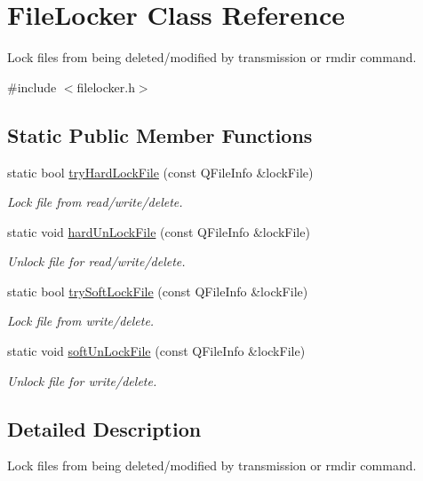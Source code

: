 \hypertarget{classFileLocker}{}\section{File\+Locker Class Reference}
\label{classFileLocker}


Lock files from being deleted/modified by transmission or rmdir command.  




{\ttfamily \#include $<$filelocker.\+h$>$}

\subsection*{Static Public Member Functions}
\begin{DoxyCompactItemize}
\item 
static bool \hyperlink{classFileLocker_ad8380762c767d038ec02d936bf974180}{try\+Hard\+Lock\+File} (const Q\+File\+Info \&lock\+File)
\begin{DoxyCompactList}\small\item\em Lock file from read/write/delete. \end{DoxyCompactList}\item 
static void \hyperlink{classFileLocker_a22ccc8e611b73bdfad46f410530c5ac9}{hard\+Un\+Lock\+File} (const Q\+File\+Info \&lock\+File)
\begin{DoxyCompactList}\small\item\em Unlock file for read/write/delete. \end{DoxyCompactList}\item 
static bool \hyperlink{classFileLocker_a107060898062f6990b58d0cb102551ac}{try\+Soft\+Lock\+File} (const Q\+File\+Info \&lock\+File)
\begin{DoxyCompactList}\small\item\em Lock file from write/delete. \end{DoxyCompactList}\item 
static void \hyperlink{classFileLocker_afcffcde6a3a2a410fc981c17c63fe706}{soft\+Un\+Lock\+File} (const Q\+File\+Info \&lock\+File)
\begin{DoxyCompactList}\small\item\em Unlock file for write/delete. \end{DoxyCompactList}\end{DoxyCompactItemize}


\subsection{Detailed Description}
Lock files from being deleted/modified by transmission or rmdir command. 

